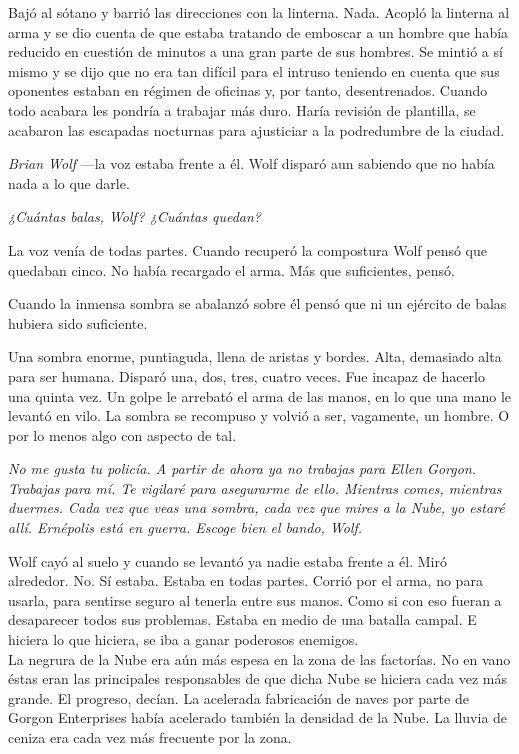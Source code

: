 Bajó al sótano y barrió las direcciones con la linterna. Nada. Acopló la linterna al arma y se dio cuenta de que estaba tratando de emboscar a un hombre que había reducido en cuestión de minutos a una gran parte de sus hombres. Se mintió a sí mismo y se dijo que no era tan difícil para el intruso teniendo en cuenta que sus oponentes estaban en régimen de oficinas y, por tanto, desentrenados. Cuando todo acabara les pondría a trabajar más duro. Haría revisión de plantilla, se acabaron las escapadas nocturnas para ajusticiar a la podredumbre de la ciudad.

\emph{Brian Wolf} ---la voz estaba frente a él. Wolf disparó aun sabiendo que no había nada a lo que darle.

\emph{¿Cuántas balas, Wolf? ¿Cuántas quedan?}

La voz venía de todas partes. Cuando recuperó la compostura Wolf pensó que quedaban cinco. No había recargado el arma. Más que suficientes, pensó.

Cuando la inmensa sombra se abalanzó sobre él pensó que ni un ejército de balas hubiera sido suficiente.

Una sombra enorme, puntiaguda, llena de aristas y bordes. Alta, demasiado alta para ser humana. Disparó una, dos, tres, cuatro veces. Fue incapaz de hacerlo una quinta vez. Un golpe le arrebató el arma de las manos, en lo que una mano le levantó en vilo. La sombra se recompuso y volvió a ser, vagamente, un hombre. O por lo menos algo con aspecto de tal.

\emph{No me gusta tu policía. A partir de ahora ya no trabajas para Ellen Gorgon. Trabajas para mí. Te vigilaré para asegurarme de ello. Mientras comes, mientras duermes. Cada vez que veas una sombra, cada vez que mires a la Nube, yo estaré allí. Ernépolis está en guerra. Escoge bien el bando, Wolf.}

Wolf cayó al suelo y cuando se levantó ya nadie estaba frente a él. Miró alrededor. No. Sí estaba. Estaba en todas partes. Corrió por el arma, no para usarla, para sentirse seguro al tenerla entre sus manos. Como si con eso fueran a desaparecer todos sus problemas. Estaba en medio de una batalla campal. E hiciera lo que hiciera, se iba a ganar poderosos enemigos.\\

\noindent{}La negrura de la Nube era aún más espesa en la zona de las factorías. No en vano éstas eran las principales responsables de que dicha Nube se hiciera cada vez más grande. El progreso, decían. La acelerada fabricación de naves por parte de Gorgon Enterprises había acelerado también la densidad de la Nube. La lluvia de ceniza era cada vez más frecuente por la zona.

